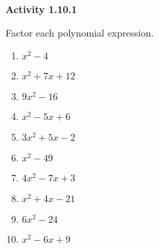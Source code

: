\vspace{0.3ex}
\noindent\textbf{Activity 1.10.1}

\vspace{0.2ex}

Factor each polynomial expression.
\begin{multicols}{2}
\begin{enumerate}
    \item $x^2 - 4$
    \item $x^2 + 7x + 12$
    \item $9x^2 - 16$
    \item $x^2 - 5x + 6$
    \item $3x^2 + 5x - 2$
    \item $x^2 - 49$
    \item $4x^2 - 7x + 3$
    \item $x^2 + 4x - 21$
    \item $6x^2 - 24$
    \item $x^2 - 6x + 9$
\end{enumerate}
\end{multicols}
